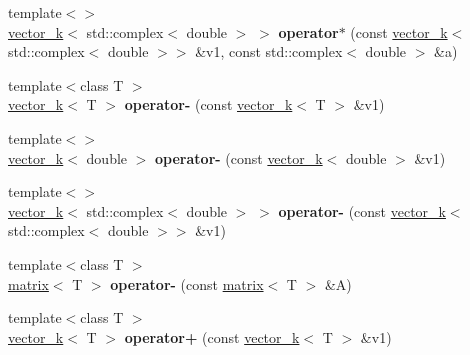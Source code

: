 \begin{DoxyCompactItemize}
\item 
\hypertarget{namespacekeycpp_ab34753e2fc26c9fab1fcbee6700c691b}{{\footnotesize template$<$$>$ }\\\hyperlink{classkeycpp_1_1vector__k}{vector\-\_\-k}$<$ std\-::complex$<$ double $>$ $>$ {\bfseries operator$\ast$} (const \hyperlink{classkeycpp_1_1vector__k}{vector\-\_\-k}$<$ std\-::complex$<$ double $>$$>$ \&v1, const std\-::complex$<$ double $>$ \&a)}\label{namespacekeycpp_ab34753e2fc26c9fab1fcbee6700c691b}

\item 
\hypertarget{namespacekeycpp_a8afc5fb1383ec8d667f52ac3778df34c}{{\footnotesize template$<$class T $>$ }\\\hyperlink{classkeycpp_1_1vector__k}{vector\-\_\-k}$<$ T $>$ {\bfseries operator-\/} (const \hyperlink{classkeycpp_1_1vector__k}{vector\-\_\-k}$<$ T $>$ \&v1)}\label{namespacekeycpp_a8afc5fb1383ec8d667f52ac3778df34c}

\item 
\hypertarget{namespacekeycpp_a18d99849477754b35d0a3187ceb60508}{{\footnotesize template$<$$>$ }\\\hyperlink{classkeycpp_1_1vector__k}{vector\-\_\-k}$<$ double $>$ {\bfseries operator-\/} (const \hyperlink{classkeycpp_1_1vector__k}{vector\-\_\-k}$<$ double $>$ \&v1)}\label{namespacekeycpp_a18d99849477754b35d0a3187ceb60508}

\item 
\hypertarget{namespacekeycpp_a77245a0566dc6436443ad15187512ef0}{{\footnotesize template$<$$>$ }\\\hyperlink{classkeycpp_1_1vector__k}{vector\-\_\-k}$<$ std\-::complex$<$ double $>$ $>$ {\bfseries operator-\/} (const \hyperlink{classkeycpp_1_1vector__k}{vector\-\_\-k}$<$ std\-::complex$<$ double $>$$>$ \&v1)}\label{namespacekeycpp_a77245a0566dc6436443ad15187512ef0}

\item 
\hypertarget{namespacekeycpp_a390125160a7febd08d5c30629f4f698f}{{\footnotesize template$<$class T $>$ }\\\hyperlink{classkeycpp_1_1matrix}{matrix}$<$ T $>$ {\bfseries operator-\/} (const \hyperlink{classkeycpp_1_1matrix}{matrix}$<$ T $>$ \&A)}\label{namespacekeycpp_a390125160a7febd08d5c30629f4f698f}

\item 
\hypertarget{namespacekeycpp_a5daa1c95786fd3745687914963e7229e}{{\footnotesize template$<$class T $>$ }\\\hyperlink{classkeycpp_1_1vector__k}{vector\-\_\-k}$<$ T $>$ {\bfseries operator+} (const \hyperlink{classkeycpp_1_1vector__k}{vector\-\_\-k}$<$ T $>$ \&v1)}\label{namespacekeycpp_a5daa1c95786fd3745687914963e7229e}


\end{DoxyCompactItemize}
